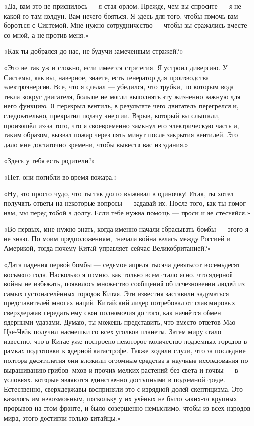 \documentclass[a5paper, 9pt,
final, openany, twoside=true]{memoir}
\begin{document}
«Да, вам это не приснилось — я стал орлом. Прежде, чем вы спросите — я не какой-то там колдун. Вам нечего бояться. Я здесь для того, чтобы помочь вам бороться с Системой. Мне нужно сотрудничество — чтобы вы сражались вместе со мной, а не против меня.»

«Как ты добрался до нас, не будучи замеченным стражей?»

«Это не так уж и сложно, если имеется стратегия. Я устроил диверсию. У Системы, как вы, наверное, знаете, есть генератор для производства электроэнергии. Всё, что я сделал — убедился, что трубки, по которым вода текла вокруг двигателя, больше не могли выполнять эту жизненно важную для него функцию. Я перекрыл вентиль, в результате чего двигатель перегрелся и, следовательно, прекратил подачу энергии. Взрыв, который вы слышали, произошёл из-за того, что я своевременно замкнул его электрическую часть и, таким образом, вызвал пожар через пять минут после закрытия вентилей. Это дало мне достаточно времени, чтобы вывести вас из здания.»

«Здесь у тебя есть родители?»

«Нет, они погибли во время пожара.»

«Ну, это просто чудо, что ты так долго выживал в одиночку! Итак, ты хотел получить ответы на некоторые вопросы — задавай их. После того, как ты помог нам, мы перед тобой в долгу. Если тебе нужна помощь — проси и не стесняйся.»

«Во-первых, мне нужно знать, когда именно начали сбрасывать бомбы — этого я не знаю. По моим предположениям, сначала война велась между Россией и Америкой, тогда почему Китай управляет сейчас Великобританией?»

«Дата падения первой бомбы — седьмое апреля тысяча девятьсот восемьдесят восьмого года. Насколько я помню, как только всем стало ясно, что ядерной войны не избежать, появилось множество сообщений об исчезновении людей из самых густонаселённых городов Китая. Эти известия заставили задуматься представителей многих наций. Китайский лидер потребовал от глав мировых сверхдержав передать ему свои полномочия до того, как начнётся обмен ядерными ударами. Думаю, ты можешь представить, что вместо ответов Мао Цзе-Чейк получил насмешки со всех уголков планеты. Затем миру стало известно, что в Китае уже построено некоторое количество подземных городов в рамках подготовки к ядерной катастрофе. Также ходили слухи, что за последние полтора десятилетия они вложили огромные средства в научные исследования по выращиванию грибов, мхов и прочих мелких растений без света и почвы — в условиях, которые являются единственно доступными в подземной среде. Естественно, сверхдержавы восприняли это с изрядной долей скептицизма. Это казалось им невозможным, поскольку у их учёных не было каких-то крупных прорывов на этом фронте, и было совершенно немыслимо, чтобы из всех народов мира, этого достигли только китайцы.»
\end{document}
